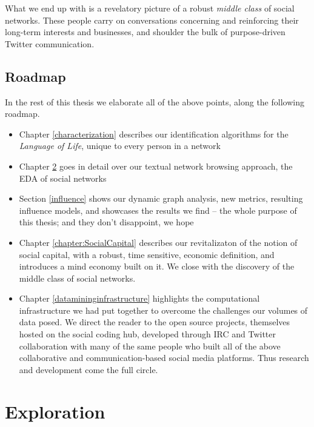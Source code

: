 \documentclass[10pt,oneside]{memoir}
\begin{document}
What we end up with is a revelatory picture of a robust {\itshape middle class} of social networks.  These people carry on conversations concerning and reinforcing their long-term interests and businesses, and shoulder the bulk of purpose-driven Twitter communication.


\pagebreak \section{Roadmap}
\label{roadmap}

In the rest of this thesis we elaborate all of the above points, along the following roadmap.


\begin{itemize}


\item Chapter \ref{characterization} describes our identification algorithms for the {\itshape Language of Life}, unique to every person in a network

\item Chapter \ref{exploration} goes in detail over our textual network browsing approach, the EDA of social networks

\item Section \ref{influence} shows our dynamic graph analysis, new metrics, resulting influence models, and showcases the results we find -- the whole purpose of this thesis; and they don't disappoint, we hope

\item Chapter \ref{chapter:SocialCapital} describes our revitalizaton of the notion of social capital, with a robust, time sensitive, economic definition, and introduces a mind economy built on it.  We close with the discovery of the middle class of social networks.

\item Chapter \ref{datamininginfrastructure} highlights the computational infrastructure we had put together to overcome the challenges our volumes of data posed.  We direct the reader to the open source projects, themselves hosted on the social coding hub, developed through IRC and Twitter collaboration with many of the same people who built all of the above collaborative and communication-based social media platforms.  Thus research and development come the full circle.
\end{itemize}

\pagebreak \chapter{Exploration}
\label{exploration}
\end{document}
